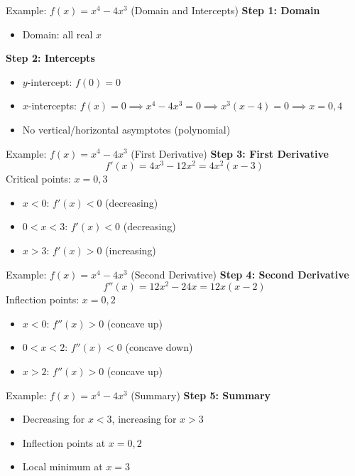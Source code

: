 \documentclass[aspectratio=169]{beamer}
\begin{document}
\begin{frame}{Example: $f(x) = x^4 - 4x^3$ (Domain and Intercepts)}
\textbf{Step 1: Domain}
\begin{itemize}
    \item Domain: all real $x$
\end{itemize}
\textbf{Step 2: Intercepts}
\begin{itemize}
    \item $y$-intercept: $f(0) = 0$
    \item $x$-intercepts: $f(x) = 0 \implies x^4 - 4x^3 = 0 \implies x^3(x-4) = 0 \implies x=0,4$
    \item No vertical/horizontal asymptotes (polynomial)
\end{itemize}
\end{frame}

\begin{frame}{Example: $f(x) = x^4 - 4x^3$ (First Derivative)}
\textbf{Step 3: First Derivative}
\[
    f'(x) = 4x^3 - 12x^2 = 4x^2(x-3)
\]
Critical points: $x=0,3$
\begin{itemize}
    \item $x<0$: $f'(x)<0$ (decreasing)
    \item $0<x<3$: $f'(x)<0$ (decreasing)
    \item $x>3$: $f'(x)>0$ (increasing)
\end{itemize}
\end{frame}

\begin{frame}{Example: $f(x) = x^4 - 4x^3$ (Second Derivative)}
\textbf{Step 4: Second Derivative}
\[
    f''(x) = 12x^2 - 24x = 12x(x-2)
\]
Inflection points: $x=0,2$
\begin{itemize}
    \item $x<0$: $f''(x)>0$ (concave up)
    \item $0<x<2$: $f''(x)<0$ (concave down)
    \item $x>2$: $f''(x)>0$ (concave up)
\end{itemize}
\end{frame}

\begin{frame}{Example: $f(x) = x^4 - 4x^3$ (Summary)}
\textbf{Step 5: Summary}
\begin{itemize}
    \item Decreasing for $x<3$, increasing for $x>3$
    \item Inflection points at $x=0,2$
    \item Local minimum at $x=3$
\end{itemize}
\end{frame}
\end{document}
